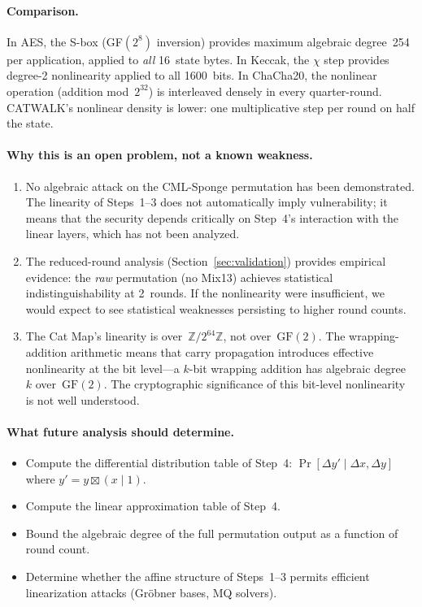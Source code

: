 \documentclass[runningheads]{llncs}
\newcommand{\Ztwo}{\mathbb{Z}/2^{64}\mathbb{Z}}
\begin{document}
\paragraph{Comparison.}
In AES, the S-box (GF$(2^8)$ inversion) provides maximum algebraic degree~254
per application, applied to \emph{all} 16~state bytes.  In Keccak, the $\chi$
step provides degree-2 nonlinearity applied to all 1600~bits.  In ChaCha20,
the nonlinear operation (addition mod~$2^{32}$) is interleaved densely in every
quarter-round.  CATWALK's nonlinear density is lower: one multiplicative step
per round on half the state.

\paragraph{Why this is an open problem, not a known weakness.}
\begin{enumerate}[nosep]
\item No algebraic attack on the CML-Sponge permutation has been demonstrated.
  The linearity of Steps~1--3 does not automatically imply vulnerability;
  it means that the security depends critically on Step~4's interaction with
  the linear layers, which has not been analyzed.
\item The reduced-round analysis (Section~\ref{sec:validation}) provides
  empirical evidence: the \emph{raw} permutation (no Mix13) achieves
  statistical indistinguishability at 2~rounds.  If the nonlinearity were
  insufficient, we would expect to see statistical weaknesses persisting
  to higher round counts.
\item The Cat Map's linearity is over~$\Ztwo$, not over~$\mathrm{GF}(2)$.
  The wrapping-addition arithmetic means that carry propagation introduces
  effective nonlinearity at the bit level---a $k$-bit wrapping addition has
  algebraic degree~$k$ over~$\mathrm{GF}(2)$.  The cryptographic significance
  of this bit-level nonlinearity is not well understood.
\end{enumerate}

\paragraph{What future analysis should determine.}
\begin{itemize}[nosep]
\item Compute the differential distribution table of Step~4:
  $\Pr[\Delta y' \mid \Delta x, \Delta y]$ where $y' = y \boxtimes (x \mathbin{|} 1)$.
\item Compute the linear approximation table of Step~4.
\item Bound the algebraic degree of the full permutation output as a function
  of round count.
\item Determine whether the affine structure of Steps~1--3 permits efficient
  linearization attacks (Gr\"obner bases, MQ solvers).
\end{itemize}
\end{document}
